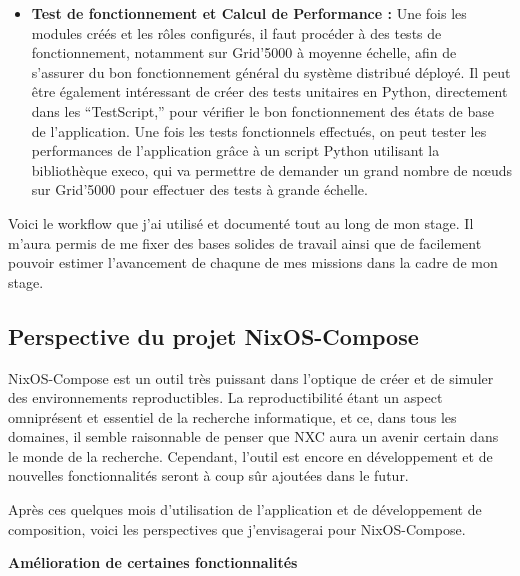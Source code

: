 \documentclass[a4paper,french,12pt, titlepage]{article}
\begin{document}
\begin{itemize}
\item
  \textbf{Test de fonctionnement et Calcul de Performance :} Une fois
  les modules créés et les rôles configurés, il faut procéder à des
  tests de fonctionnement, notamment sur Grid'5000 à moyenne échelle,
  afin de s'assurer du bon fonctionnement général du système distribué
  déployé. Il peut être également intéressant de créer des tests
  unitaires en Python, directement dans les ``TestScript,'' pour
  vérifier le bon fonctionnement des états de base de l'application. Une
  fois les tests fonctionnels effectués, on peut tester les performances
  de l'application grâce à un script Python utilisant la bibliothèque
  execo, qui va permettre de demander un grand nombre de nœuds sur
  Grid'5000 pour effectuer des tests à grande échelle.\newline
\end{itemize}

Voici le workflow que j'ai utilisé et documenté tout au long de mon
stage. Il m'aura permis de me fixer des bases solides de travail ainsi
que de facilement pouvoir estimer l'avancement de chaqune de mes
missions dans la cadre de mon stage.

\newpage

\hypertarget{perspective-du-projet-nixos-compose}{%
\subsection{Perspective du projet
NixOS-Compose}\label{perspective-du-projet-nixos-compose}}

NixOS-Compose est un outil très puissant dans l'optique de créer et de
simuler des environnements reproductibles. La reproductibilité étant un
aspect omniprésent et essentiel de la recherche informatique, et ce,
dans tous les domaines, il semble raisonnable de penser que NXC aura un
avenir certain dans le monde de la recherche. Cependant, l'outil est
encore en développement et de nouvelles fonctionnalités seront à coup
sûr ajoutées dans le futur.

Après ces quelques mois d'utilisation de l'application et de
développement de composition, voici les perspectives que j'envisagerai
pour NixOS-Compose.\newline

\textbf{Amélioration de certaines fonctionnalités}\newline
\end{document}
